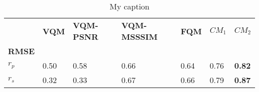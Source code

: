 \begin{table}[]
\centering
\caption{My caption}
\label{my-label}
\begin{tabular}{lllllll}
              & \textbf{VQM} & \textbf{VQM-PSNR} & \textbf{VQM-MSSSIM} & \textbf{FQM}  \cite{Tian_2004} & $CM_1$ & $CM_2$  \\
\textbf{RMSE} &              &                   &                     &              &              &               \\
$r_p$            & 0.50         & 0.58              & 0.66                & 0.64         & 0.76         & \textbf{0.82} \\
$r_s$           & 0.32         & 0.33              & 0.67                & 0.66         & 0.79         & \textbf{0.87}
\end{tabular}
\end{table}